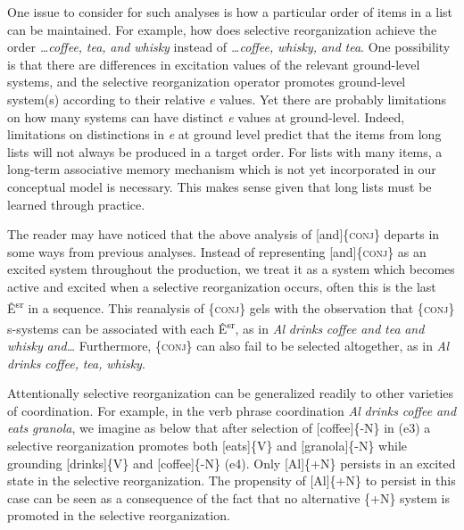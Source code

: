   One issue to consider for such analyses is how a particular order of items in a list can be maintained. For example, how does selective reorganization achieve the order \textit{…coffee,} \textit{tea,} \textit{and} \textit{whisky} instead of \textit{…coffee,} \textit{whisky,} \textit{and} \textit{tea}. One possibility is that there are differences in excitation values of the relevant ground-level systems, and the selective reorganization operator promotes ground-level system(s) according to their relative \textit{e} values. Yet there are probably limitations on how many systems can have distinct \textit{e} values at ground-level. Indeed, limitations on distinctions in \textit{e} at ground level predict that the items from long lists will not always be produced in a target order. For lists with many items, a long-term associative memory mechanism which is not yet incorporated in our conceptual model is necessary. This makes sense given that long lists must be learned through practice.

  The reader may have noticed that the above analysis of [and]\{\textsc{conj}\} departs in some ways from previous analyses. Instead of representing [and]\{\textsc{conj}\} as an excited system throughout the production, we treat it as a system which becomes active and excited when a selective reorganization occurs, often this is the last Ê\textsuperscript{sr} in a sequence. This reanalysis of \{\textsc{conj}\} gels with the observation that \{\textsc{conj}\} s-systems can be associated with each Ê\textsuperscript{sr}, as in \textit{Al} \textit{drinks} \textit{coffee} \textit{and} \textit{tea} \textit{and} \textit{whisky} \textit{and…} Furthermore, \{\textsc{conj}\} can also fail to be selected altogether, as in \textit{Al} \textit{drinks} \textit{coffee,} \textit{tea,} \textit{whisky}.

  Attentionally selective reorganization can be generalized readily to other varieties of coordination. For example, in the verb phrase coordination \textit{Al} \textit{drinks} \textit{coffee} \textit{and} \textit{eats} \textit{granola}, we imagine as below that after selection of [coffee]\{-N\} in (e3) a selective reorganization promotes both [eats]\{V\} and [granola]\{-N\} while grounding [drinks]\{V\} and [coffee]\{-N\} (e4). Only [Al]\{+N\} persists in an excited state in the selective reorganization. The propensity of [Al]\{+N\} to persist in this case can be seen as a consequence of the fact that no alternative \{+N\} system is promoted in the selective reorganization.

